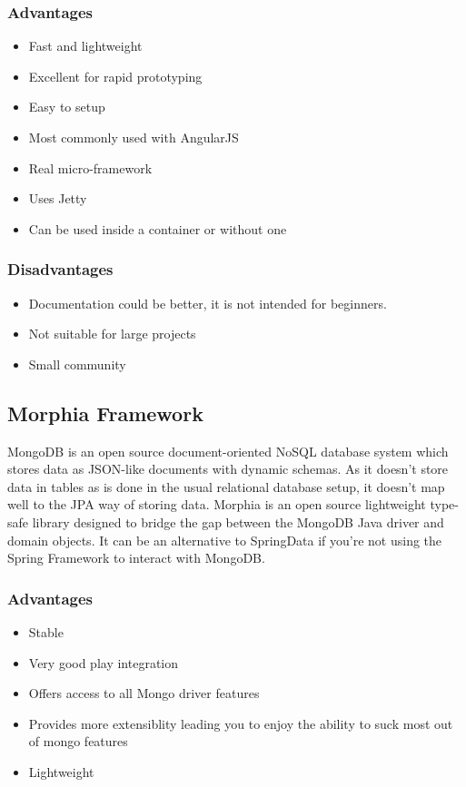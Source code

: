 \documentclass[a4paper, hidelinks, 12pt]{report}
\begin{document}
\subsubsection{Advantages}
		\begin{itemize}
		\item{} Fast and lightweight
	\item{} Excellent for rapid prototyping
	\item{} Easy to setup
	\item{} Most commonly used with AngularJS
	\item{} Real micro-framework
	\item{} Uses Jetty
	\item{} Can be used inside a container or without one
		\end{itemize}
\subsubsection{Disadvantages}
			\begin{itemize}
		\item{} Documentation could be better, it is not intended for beginners.
		\item{} Not suitable for large projects
		\item{} Small community
		\end{itemize}

\subsection{Morphia Framework} MongoDB is an open source document-oriented NoSQL database system which stores data as JSON-like documents with dynamic schemas.  As it doesn't store data in tables as is done in the usual relational database setup, it doesn't map well to the JPA way of storing data. Morphia is an open source lightweight type-safe library designed to bridge the gap between the MongoDB Java driver and domain objects. It can be an alternative to SpringData if you're not using the Spring Framework to interact with MongoDB.

\subsubsection{Advantages}

		\begin{itemize}
		\item{} Stable
	\item{} Very good play integration
	\item{} Offers access to all Mongo driver features
	\item{} Provides more extensiblity leading you to enjoy the ability to suck most out of mongo features
	\item{} Lightweight
		\end{itemize}
\end{document}
